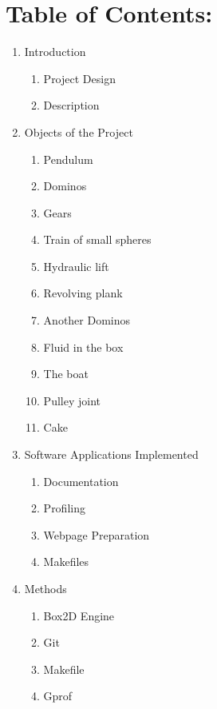 \documentclass{article}
\begin{document}
\section*{\huge Table of Contents:} \label{Contents}
\begin{enumerate}
    \LARGE  \item Introduction
    \begin{enumerate} [label*=\arabic*.]
        \large \item Project Design
        \large \item Description
    \end{enumerate}
    \LARGE  \item Objects of the Project
    \begin{enumerate} [label*=\arabic*.]
        \large \item Pendulum
        \large \item Dominos
        \large \item Gears
        \large \item Train of small spheres
        \large \item Hydraulic lift
        \large \item Revolving plank
        \large \item Another Dominos
        \large \item Fluid in the box
        \large \item The boat 
        \large \item Pulley joint
        \large \item Cake 
    \end{enumerate}
    \LARGE  \item Software Applications Implemented
    \begin{enumerate} [label*=\arabic*.]
        \large \item Documentation
        \large \item Profiling
        \large \item Webpage Preparation
        \large \item Makefiles
    \end{enumerate}
    \LARGE  \item Methods
    \begin{enumerate} [label*=\arabic*.]
        \large \item Box2D Engine
        \large \item Git
        \large \item Makefile
        \large \item Gprof

\end{enumerate}
\end{enumerate}
\end{document}
